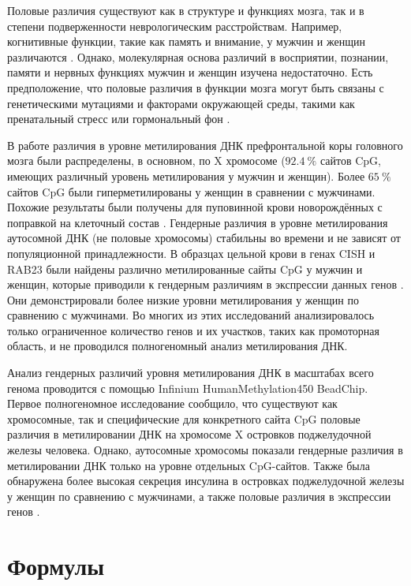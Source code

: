 Половые различия существуют как в структуре и функциях мозга, так и в степени подверженности неврологическим расстройствам. Например, когнитивные функции, такие как память и внимание, у мужчин и женщин различаются \autocite{Gur1999}. Однако, молекулярная основа различий в восприятии, познании, памяти и нервных функциях мужчин и женщин изучена недостаточно. Есть предположение, что половые различия в функции мозга могут быть связаны с генетическими мутациями \autocite{Qureshi2010} и факторами окружающей среды, такими как пренатальный стресс \autocite{Bowman2004} или гормональный фон \autocite{Lenz2010}.

В работе \autocite{Xu2013} различия в уровне метилирования ДНК префронтальной коры головного мозга были распределены, в основном, по X хромосоме ($92.4~\%$ сайтов CpG, имеющих различный уровень метилирования у мужчин и женщин). Более $65~\%$ сайтов CpG были гиперметилированы у женщин в сравнении с мужчинами. Похожие результаты были получены для пуповинной крови новорождённых с поправкой на клеточный состав \autocite{Yousefi2015}. Гендерные различия в уровне метилирования аутосомной ДНК (не половые хромосомы) стабильны во времени и не зависят от популяционной принадлежности. В образцах цельной крови в генах CISH и RAB23 были найдены различно метилированные сайты CpG у мужчин и женщин, которые приводили к гендерным различиям в экспрессии данных генов \autocite{Singmann2015}. Они демонстрировали более низкие уровни метилирования у женщин по сравнению с мужчинами. Во многих из этих исследований анализировалось только ограниченное количество генов и их участков, таких как промоторная область, и не проводился полногеномный анализ метилирования ДНК.

Анализ гендерных различий уровня метилирования ДНК в масштабах всего генома проводится с помощью Infinium HumanMethylation450 BeadChip. Первое полногеномное исследование сообщило, что существуют как хромосомные, так и специфические для конкретного сайта CpG половые различия в метилировании ДНК на хромосоме X островков поджелудочной железы человека. Однако, аутосомные хромосомы показали гендерные различия в метилировании ДНК только на уровне отдельных CpG-сайтов. Также была обнаружена более высокая секреция инсулина в островках поджелудочной железы у женщин по сравнению с мужчинами, а также половые различия в экспрессии генов \autocite{Hall2014}. 




\section{Формулы}\label{sec:ch1/sec3}

